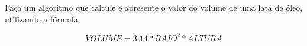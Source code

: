 
\question[10]

Faça um algoritmo que calcule e apresente o valor do volume de uma lata de óleo, utilizando a fórmula:

\begin{equation}
	VOLUME = 3.14 * RAIO^2*ALTURA
\end{equation}
